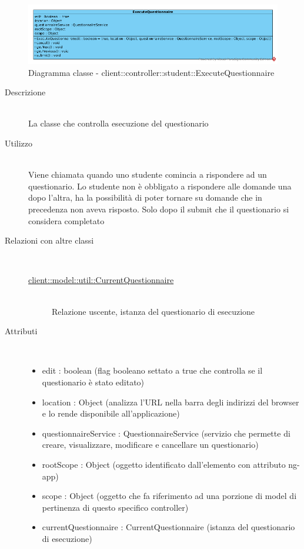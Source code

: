 \begin{center}
			\begin{figure}[H]
				\centering \includegraphics[scale=4, max width=\textwidth, max height=\myheight]{../img/diagrammiClassi/client/controller/student/ExecuteQuestionnaire.png}
				\caption{Diagramma classe - client::controller::student::ExecuteQuestionnaire}
			\end{figure}
		\end{center}\begin{description}
\item[Descrizione] \hfill \\
 La classe che controlla esecuzione del questionario 
\item[Utilizzo] \hfill \\
 Viene chiamata quando uno studente comincia a rispondere ad un questionario. Lo studente non è obbligato a rispondere alle domande una dopo l'altra, ha la possibilità di poter tornare su domande che in precedenza non aveva risposto. Solo dopo il submit che il questionario si considera completato
\item[Relazioni con altre classi] \hfill \\
 \vspace{-7mm}
\begin{description}
\item[\hyperlink{client::model::util::CurrentQuestionnaire}{client::model::util::CurrentQuestionnaire}] \hfill \\
 Relazione uscente, istanza del questionario di esecuzione
\end{description}

\item[Attributi] \hfill \\
 \vspace{-7mm}
\begin{itemize}
\item edit : boolean (flag booleano settato a true che controlla se il questionario è stato editato)
\item location : Object (analizza l'URL nella barra degli indirizzi del browser e lo rende disponibile all'applicazione)
\item questionnaireService : QuestionnaireService (servizio che permette di creare, visualizzare, modificare e cancellare un questionario)
\item rootScope : Object (oggetto identificato dall’elemento con attributo ng-app)
\item scope : Object (oggetto che fa riferimento ad una porzione di model di pertinenza di questo specifico controller)
\item currentQuestionnaire : CurrentQuestionnaire (istanza del questionario di esecuzione)
\end{itemize}


\end{description}
